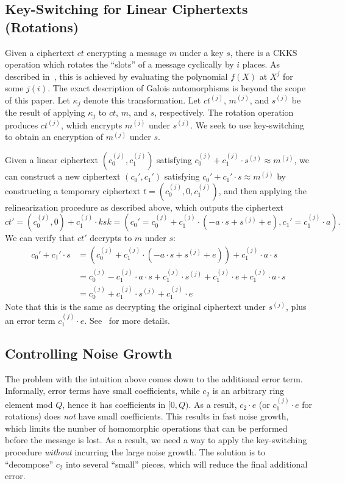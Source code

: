 \documentclass[../keyswitching.tex]{subfiles}
\begin{document}
\subsection{Key-Switching for Linear Ciphertexts (Rotations)}
Given a ciphertext $ct$ encrypting a message $m$ under a key $s$, there is a CKKS operation which rotates the ``slots'' of a message cyclically by $i$ places. As described in~\cite[Section 2.2]{cryptoeprint:2012/099}, this is achieved by evaluating the polynomial $f(X)$ at $X^j$ for some $j(i)$. The exact description of Galois automorphisms is beyond the scope of this paper. Let $\kappa_j$ denote this transformation. Let $ct^{(j)}$, $m^{(j)}$, and $s^{(j)}$ be the result of applying $\kappa_j$ to $ct$, $m$, and $s$, respectively. The rotation operation produces $ct^{(j)}$, which encrypts $m^{(j)}$ under $s^{(j)}$. We seek to use key-switching to obtain an encryption of $m^{(j)}$ under $s$.

Given a linear ciphertext $(c_0^{(j)}, c_1^{(j)})$ satisfying $c_0^{(j)} + c_1^{(j)}\cdot s^{(j)} \approx m^{(j)}$, we can construct a new ciphertext $(c_0', c_1')$ satisfying $c_0' + c_1'\cdot s \approx m^{(j)}$ by constructing a temporary ciphertext $t=(c_0^{(j)}, 0, c_1^{(j)})$, and then applying the relinearization procedure as described above, which outputs the ciphertext
\[ct' = (c_0^{(j)}, 0) + c_1^{(j)}\cdot ksk = (c_0'=c_0^{(j)} + c_1^{(j)}\cdot(-a\cdot s + s^{(j)} + e), c_1'=c_1^{(j)}\cdot a).\]
We can verify that $ct'$ decrypts to $m$ under $s$:
\begin{align*}
	c_0' + c_1'\cdot s &= (c_0^{(j)} + c_1^{(j)}\cdot(-a\cdot s + s^{(j)} + e)) + c_1^{(j)}\cdot a\cdot s \\
	&= c_0^{(j)} - c_1^{(j)}\cdot a\cdot s + c_1^{(j)}\cdot s^{(j)} + c_1^{(j)}\cdot e + c_1^{(j)}\cdot a\cdot s \\
	&= c_0^{(j)} + c_1^{(j)}\cdot s^{(j)} + c_1^{(j)}\cdot e
\end{align*}
Note that this is the same as decrypting the original ciphertext under $s^{(j)}$, plus an error term $c_1^{(j)}\cdot e$. See~\cite[Appendix B]{cryptoeprint:2012/099} for more details.

\subsection{Controlling Noise Growth}
\label{sec:ksnoisecontrol}
The problem with the intuition above comes down to the additional error term. Informally, error terms have small coefficients, while $c_2$ is an arbitrary ring element mod $Q$, hence it has coefficients in $[0,Q)$. As a result, $c_2\cdot e$ (or $c_1^{(j)}\cdot e$ for rotations) does \emph{not} have small coefficients. This results in fast noise growth, which limits the number of homomorphic operations that can be performed before the message is lost. As a result, we need a way to apply the key-switching procedure \emph{without} incurring the large noise growth. The solution is to ``decompose'' $c_2$ into several ``small'' pieces, which will reduce the final additional error. 
\end{document}

